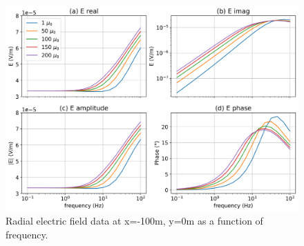 \begin{figure}[H]
    \begin{center}
    \includegraphics[width=\columnwidth]{figures/data-100m-frequency.png}
    \end{center}
\caption{
    Radial electric field data at x=-100m, y=0m as a function of frequency.
}
\label{fig:data-100m-frequency}
\end{figure}



